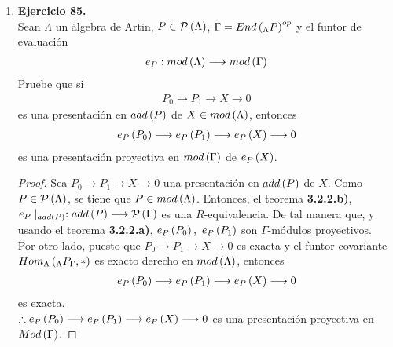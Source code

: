 \documentclass{article}
\begin{document}
\begin{enumerate}
\begin{proof}
		$\boxed{\Leftarrow )}$ Sea $g \in Hom\lrprth{f,f}$. En consecuencia, $g \in End_{R}\lrprth{M}$ y $fg=f$. Por consiguiente, $\overline{f}g=f\mid^{Im\lrprth{f}}g=f\mid^{Im\lrprth{f}}=\overline{f}$. Lo cual implica que $g \in Hom\lrprth{\overline{f},\overline{f}}$. Más aún, $g$ es un isomorfismo, toda vez que $\overline{f}$ es minimal a derecha. $\therefore f$ es minimal a derecha.
	\end{proof}
	
	\item \textbf{Ejercicio 85.}\\
	Sean $\Lambda$ un álgebra de Artin, $P\in\mathcal{P}\left(\Lambda\right)$, $\Gamma = {End\left(_{\Lambda}P\right)}^{op}$ y el funtor de evaluación
	\begin{align*}
		e_{P}:mod\left(\Lambda\right)\longrightarrow mod\left(\Gamma\right)
	\end{align*}
	Pruebe que si
	\begin{align*}
		P_{0} \longrightarrow P_{1} \longrightarrow X \longrightarrow 0
	\end{align*}
	es una presentación en $add\left(P\right)$ de $X \in mod\left(\Lambda\right)$, entonces 
	\begin{align*}
		e_{P}\left(P_{0}\right) \longrightarrow e_{P}\left(P_{1}\right) \longrightarrow e_{P}\left(X\right) \longrightarrow 0
	\end{align*}
	es una presentación proyectiva en $mod\left(\Gamma\right)$ de $e_{P}\left(X\right)$.
	\begin{proof}
		Sea	$P_{0} \longrightarrow P_{1} \longrightarrow X \longrightarrow 0$ una presentación en $add\left(P\right)$ de $X$. Como $P\in\mathcal{P}\left(\Lambda\right)$,  se tiene que $P \in mod\left(\Lambda\right)$. Entonces, el teorema \textbf{3.2.2.b)}, $e_{P}\mid_{add\left(P\right)}:add\left(P\right)\longrightarrow\mathcal{P}\left(\Gamma\right)$ es una $R$-equivalencia. De tal manera que, y usando el teorema \textbf{3.2.2.a)}, $e_{P}\left(P_{0}\right),\ e_{P}\left(P_{1}\right)$ son $\Gamma$-módulos proyectivos.\\
		
		Por otro lado, puesto que $P_{0} \longrightarrow P_{1} \longrightarrow X \longrightarrow 0$ es exacta y el funtor covariante $\ringmodhom{\Lambda}{\ringbimod{\Lambda}{\Gamma}{P}{lr}}{*}$ es exacto derecho en $mod\left(\Lambda\right)$, entonces
		\begin{align*}
			e_{P}\left(P_{0}\right) \longrightarrow e_{P}\left(P_{1}\right) \longrightarrow e_{P}\left(X\right) \longrightarrow 0
		\end{align*}
		es exacta.\\
		$\therefore e_{P}\left(P_{0}\right) \longrightarrow e_{P}\left(P_{1}\right) \longrightarrow e_{P}\left(X\right) \longrightarrow 0$ es una presentación proyectiva en $Mod\left(\Gamma\right)$.
	\end{proof}
	

\end{enumerate}
\end{document}

